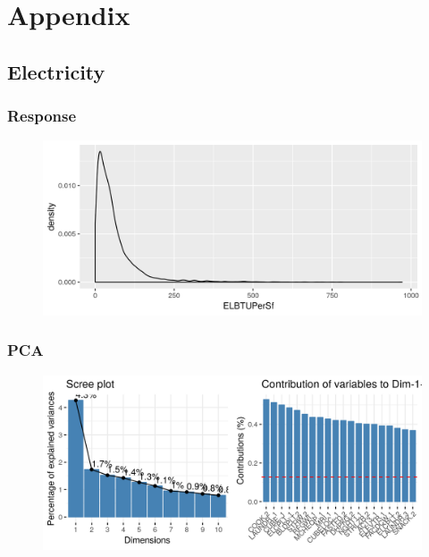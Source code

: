 \section*{Appendix}

\appendix
\subsection*{Electricity}
\subsubsection*{Response}
\label{appendix:electricity:response}
\begin{figure}[h]
\includegraphics[width=\textwidth]{Images/electricity_response.png}
\centering
\end{figure}
\subsubsection*{PCA}
\label{appendix:electricity:pca}
\begin{figure}[h]
\includegraphics[width=\textwidth]{Images/electricity_pca.png}
\centering
\end{figure}
\label{appendix:electricity:pls}